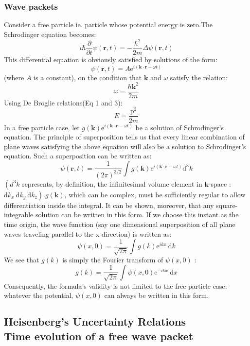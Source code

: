 \documentclass[%
 reprint,
 amsmath,amssymb,
 aps,
]{revtex4-2}
\begin{document}
\subsubsection{Wave packets}

Consider a free particle ie. particle whose potential energy is zero.The Schrodinger equation becomes:$$
i \hbar \frac{\partial}{\partial t} \psi(\mathbf{r}, t)=-\frac{\hbar^2}{2 m} \Delta \psi(\mathbf{r}, t)
$$
This differential equation is obviously satisfied by solutions of the form:
$$
\psi(\mathbf{r}, t)=A \mathrm{e}^{i(\mathbf{k} \cdot\mathbf{r}-\omega t)}
$$
(where $A$ is a constant), on the condition that $\mathbf{k}$ and $\omega$ satisfy the relation:
$$
\omega=\frac{\hbar \mathbf{k}^2}{2 m}
$$
Using De Broglie relations(Eq 1 and 3):
$$
E=\frac{\mathrm{p}^2}{2 m}
$$
In a free particle case, let $ g(\mathbf{k}) \mathrm{e}^{i(\mathbf{k} \cdot\mathbf{r}-\omega t)}$ be a solution of Schrodinger's equation. The principle of superposition tells us that every linear combination of plane waves satisfying the above equation will also be a solution to Schrodinger's equation. Such a superposition can be written as:
$$
\psi(\mathbf{r}, t)=\frac{1}{(2 \pi)^{3 / 2}} \int g(\mathbf{k}) \mathrm{e}^{i(\mathbf{k} \cdot\mathbf{r}-\omega t)} \mathrm{d}^3 k
$$
$\left(d^3 k\right.$ represents, by definition, the infinitesimal volume element in $\mathbf{k}$-space : $\left.\mathrm{d} k_x \mathrm{~d} k_y \mathrm{~d} k_z\right). g(\mathbf{k})$, which can be complex, must be sufficiently regular to allow differentiation inside the integral. It can be shown, moreover, that any square-integrable solution can be written in this form. If we choose this instant as the time origin, the wave function (say one dimensional superposition of all plane waves traveling parallel to the x direction)  is written as:
$$
\psi(x, 0)=\frac{1}{\sqrt{2 \pi}} \int g(k) \mathrm{e}^{i k x} \mathrm{~d} k
$$
We see that $g(k)$ is simply the Fourier transform of $\psi(x, 0)$ :
$$
g(k)=\frac{1}{\sqrt{2 \pi}} \int \psi(x, 0) \mathrm{e}^{-i k x} \mathrm{~d} x
$$
Consequently, the formula's validity is not limited to the free particle case: whatever the potential, $\psi(x, 0)$ can always be written in this form.
\subsection{Heisenberg's Uncertainty Relations \protect\\ Time evolution of a free wave packet}
\end{document}
